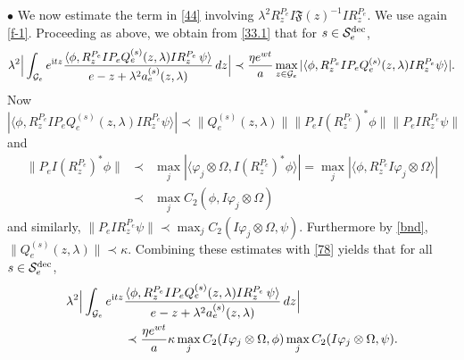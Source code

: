 \documentclass[letterpaper,onecolumn,11pt,accepted=2021-12-09]{quantumarticle}
\numberwithin{equation}{section}
\newcommand{\aes}{a_e^{(s)}}
\newcommand{\Qes}{Q_e^{(s)}}
\renewcommand{\i}{{\rm i}}
\begin{document}
$\bullet$ We now estimate the term in \eqref{44} involving $ \lambda^2 R_z^{P_e} I{\mathfrak F}(z)^{-1} I R_z^{P_e}$. We use again \eqref{f-1}. Proceeding as above, we obtain from \eqref{33.1} that for $s\in{\mathcal S}_e^{\rm dec}$,
\begin{equation}
\lambda^2 \Big| \int_{{\mathcal G}_e} e^{\i tz}\frac{\langle \phi,   R^{P_e}_z I P_e \Qes(z,\lambda) I R_z^{P_e} \,    \psi \rangle}{e-z+\lambda^2\aes(z,\lambda)} \, dz\Big|
 \prec \frac{\eta e^{wt}}{a}   \max_{z\in{\mathcal G}_e} |\langle \phi, R_z^{P_e} IP_e  \Qes(z,\lambda) IR_z^{P_e} \psi\rangle|.	
\label{78}
\end{equation}
Now 
\begin{equation}
|\langle \phi,R_z^{P_e} IP_e  \Qes(z,\lambda) IR_z^{P_e} \psi\rangle| \prec \|\Qes(z,\lambda)\| \|P_eI (R_z^{P_e})^*\phi\| \|P_eI R_z^{P_e}\psi\|
\label{m111}
\end{equation} 
and 
\begin{eqnarray}
\|P_eI (R_z^{P_e})^*\phi\| 
&\prec&\max_j |\langle\varphi_j\otimes\Omega, I (R_z^{P_e})^* \phi\rangle| = \max_j |\langle\phi,  R_z^{P_e} I \varphi_j\otimes\Omega \rangle| \nonumber\\
&\prec&  \max_j C_2(\phi, I\varphi_j\otimes\Omega)
\nonumber
\end{eqnarray}
and similarly, $\|P_eIR_z^{P_e}\psi\|\prec \max_j C_2( I\varphi_j\otimes\Omega,\psi)$. Furthermore by \eqref{bnd}, $\|\Qes(z,\lambda)\|\prec \kappa$. Combining these estimates with \eqref{78} yields that for all $s\in{\mathcal S}_e^{\rm dec}$,
\begin{align}
\lambda^2 \Big| \int_{{\mathcal G}_e} e^{\i tz} & \frac{\langle \phi,   R^{P_e}_z I P_e \Qes(z,\lambda) I R_z^{P_e} \,    \psi \rangle}{e-z+\lambda^2\aes(z,\lambda)} \, dz\Big| \nonumber\\
& \prec \frac{\eta e^{wt}}{a} \kappa  \max_j C_2(I\varphi_j\otimes\Omega, \phi) \max_j C_2(I\varphi_j\otimes\Omega, \psi).
\end{align}
\end{document}
